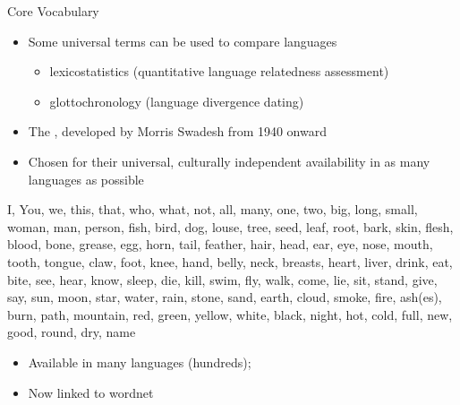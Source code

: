 \begin{frame}[allowframebreaks]{Core Vocabulary}
\begin{itemize}
\item Some universal terms can be used to compare languages
  \begin{itemize}
  \item lexicostatistics (quantitative language relatedness assessment)
  \item glottochronology (language divergence dating)
\end{itemize}
\item The , developed by Morris Swadesh from 1940
  onward 
\item Chosen for their universal, culturally independent availability in as many languages as possible
\end{itemize}

\framebreak
\vspace*{-2ex}
I, You, we, this, that, who, what, not, all, many, one, two, big,
long, small, woman, man, person, fish, bird, dog, louse, tree, seed,
leaf, root, bark, skin, flesh, blood, bone, grease, egg, horn, tail,
feather, hair, head, ear, eye, nose, mouth, tooth, tongue, claw, foot,
knee, hand, belly, neck, breasts, heart, liver, drink, eat, bite, see,
hear, know, sleep, die, kill, swim, fly, walk, come, lie, sit, stand,
give, say, sun, moon, star, water, rain, stone, sand, earth, cloud,
smoke, fire, ash(es), burn, path, mountain, red, green, yellow, white,
black, night, hot, cold, full, new, good, round, dry, name
\vspace*{-1ex}
\begin{itemize}
\item Available in many languages (hundreds); 
\item Now linked to wordnet \citep{daCosta:Bond:Kratochvil:2016}
  
\end{itemize}
\end{frame}


